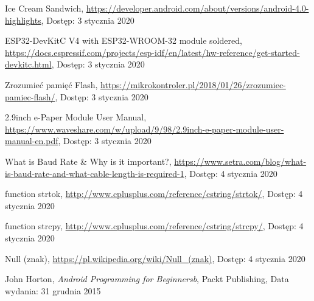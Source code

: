 \documentclass[a4paper,12pt, twoside]{article}
\begin{document}
\begin{thebibliography}{}
    		Ice Cream Sandwich,
    		\newline\url{https://developer.android.com/about/versions/android-4.0-highlights}, 
    		\newline Dostęp: 3 stycznia 2020
    		
    		ESP32-DevKitC V4 with ESP32-WROOM-32 module soldered,
    		\newline\url{https://docs.espressif.com/projects/esp-idf/en/latest/hw-reference/get-started-devkitc.html}, 
    		\newline Dostęp: 3 stycznia 2020
    		
    		Zrozumieć pamięć Flash,
    		\newline\url{https://mikrokontroler.pl/2018/01/26/zrozumiec-pamiec-flash/}, 
    		\newline Dostęp: 3 stycznia 2020
    		
    		2.9inch e-Paper Module User Manual,
    		\newline\url{https://www.waveshare.com/w/upload/9/98/2.9inch-e-paper-module-user-manual-en.pdf}, 
    		\newline Dostęp: 3 stycznia 2020
    		
    		What is Baud Rate \& Why is it important?,
    		\newline\url{https://www.setra.com/blog/what-is-baud-rate-and-what-cable-length-is-required-1}, 
    		\newline Dostęp: 4 stycznia 2020
    		
    		function strtok,
    		\newline\url{http://www.cplusplus.com/reference/cstring/strtok/}, 
    		\newline Dostęp: 4 stycznia 2020
    		
    		function strcpy,
    		\newline\url{http://www.cplusplus.com/reference/cstring/strcpy/}, 
    		\newline Dostęp: 4 stycznia 2020
    		
    		Null (znak),
    		\newline\url{https://pl.wikipedia.org/wiki/Null_(znak)}, 
    		\newline Dostęp: 4 stycznia 2020
    		
    	    John Horton, \textit{Android Programming for Beginnersb}, Packt Publishing,
    		\newline Data wydania: 31 grudnia 2015
    		

\end{thebibliography}
\end{document}
